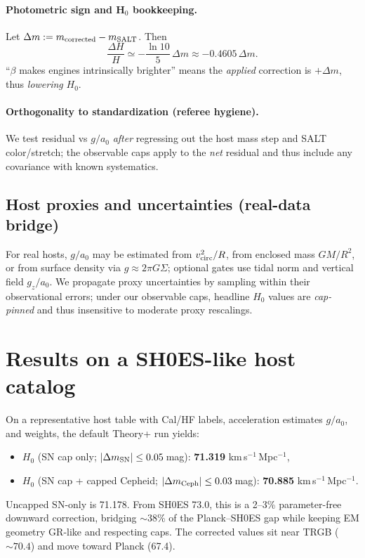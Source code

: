 \documentclass[aps,prd,preprint,onecolumn,longbibliography,nofootinbib]{revtex4-2}
\theoremstyle{plain}
\theoremstyle{remark}
\newcommand{\Hzero}{H_0}
\newcommand{\be}{\beta}
\begin{document}
\paragraph*{Photometric sign and H$_0$ bookkeeping.}
Let $\Delta m:=m_{\rm corrected}-m_{\rm SALT}$. Then
\begin{equation}
\frac{\Delta H}{H}\simeq -\frac{\ln 10}{5}\,\Delta m \approx -0.4605\,\Delta m.
\end{equation}
“$\be$ makes engines intrinsically brighter” means the \emph{applied} correction is $+\Delta m$, thus \emph{lowering} $H_0$.

\paragraph*{Orthogonality to standardization (referee hygiene).}
We test residual vs $g/a_0$ \emph{after} regressing out the host mass step and SALT color/stretch; the observable caps apply to the \emph{net} residual and thus include any covariance with known systematics.

\subsection{Host proxies and uncertainties (real-data bridge)}\label{sec:host_proxies}
For real hosts, $g/a_0$ may be estimated from $v_{\rm circ}^2/R$, from enclosed mass $GM/R^2$, or from surface density via $g\!\approx\! 2\pi G\Sigma$; optional gates use tidal norm and vertical field $g_z/a_0$. We propagate proxy uncertainties by sampling within their observational errors; under our observable caps, headline $H_0$ values are \emph{cap-pinned} and thus insensitive to moderate proxy rescalings.

\section{Results on a SH0ES-like host catalog}
On a representative host table with Cal/HF labels, acceleration estimates $g/a_0$, and weights, the default Theory+ run yields:
\begin{itemize}
\item $\Hzero$ (SN cap only; $|\Delta m_{\rm SN}|\le 0.05$\,mag): \textbf{71.319} km\,s$^{-1}$\,Mpc$^{-1}$,
\item $\Hzero$ (SN cap + capped Cepheid; $|\Delta m_{\rm Ceph}|\le 0.03$\,mag): \textbf{70.885} km\,s$^{-1}$\,Mpc$^{-1}$.
\end{itemize}
Uncapped SN-only is 71.178. From SH0ES 73.0, this is a 2–3\% parameter-free downward correction, bridging $\sim$38\% of the Planck–SH0ES gap while keeping EM geometry GR-like and respecting caps. The corrected values sit near TRGB ($\sim 70.4$) and move toward Planck (67.4).
\end{document}
